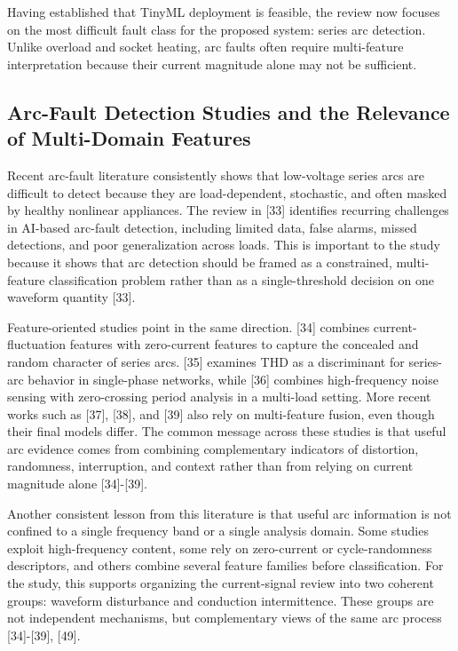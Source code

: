 Having established that TinyML deployment is feasible, the review now
focuses on the most difficult fault class for the proposed system:
series arc detection. Unlike overload and socket heating, arc faults
often require multi-feature interpretation because their current
magnitude alone may not be sufficient.

\subsection{Arc-Fault Detection Studies and the Relevance of Multi-Domain Features}\label{arc-fault-detection-studies-and-the-relevance-of-multi-domain-features}

Recent arc-fault literature consistently shows that low-voltage series
arcs are difficult to detect because they are load-dependent,
stochastic, and often masked by healthy nonlinear appliances. The review
in {[}33{]} identifies recurring challenges in AI-based arc-fault
detection, including limited data, false alarms, missed detections, and
poor generalization across loads. This is important to the study because
it shows that arc detection should be framed as a constrained,
multi-feature classification problem rather than as a single-threshold
decision on one waveform quantity {[}33{]}.

Feature-oriented studies point in the same direction. {[}34{]} combines
current-fluctuation features with zero-current features to capture the
concealed and random character of series arcs. {[}35{]} examines THD as
a discriminant for series-arc behavior in single-phase networks, while
{[}36{]} combines high-frequency noise sensing with zero-crossing period
analysis in a multi-load setting. More recent works such as {[}37{]},
{[}38{]}, and {[}39{]} also rely on multi-feature fusion, even though
their final models differ. The common message across these studies is
that useful arc evidence comes from combining complementary indicators
of distortion, randomness, interruption, and context rather than from
relying on current magnitude alone {[}34{]}-{[}39{]}.

Another consistent lesson from this literature is that useful arc
information is not confined to a single frequency band or a single
analysis domain. Some studies exploit high-frequency content, some rely
on zero-current or cycle-randomness descriptors, and others combine
several feature families before classification. For the study, this
supports organizing the current-signal review into two coherent groups:
waveform disturbance and conduction intermittence. These groups are not
independent mechanisms, but complementary views of the same arc process
{[}34{]}-{[}39{]}, {[}49{]}.

